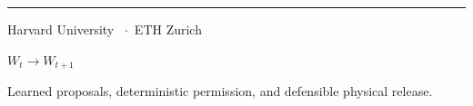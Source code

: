 {\begin{titlepage}
%
  \restoregeometry
\end{titlepage}%

\begin{titlepage}\thispagestyle{empty}%
  \raggedright
  \vspace*{0.9in}
  {\textcolor{harvardcrimson}{\rule{2.8in}{1.6pt}}\par}
  \vspace{0.35in}
  {\sffamily\bfseries\fontsize{28}{32}\selectfont\color{structural}\@title\par}
  \vspace{0.12in}
  {\sffamily\bfseries\fontsize{13}{17}\selectfont\color{consequence}\@subtitle\par}
  \vspace{0.8in}
  {\sffamily\large\bfseries\color{structural}\@author\par}
  \vspace{0.06in}
  {\sffamily\normalsize\color{softink}Harvard University \ $\cdot$\  ETH Zurich\par}
  \vspace{0.25in}
  {\sffamily\small\color{softink}\@date\par}
  \vfill
  {\sffamily\bfseries\color{consequence}$W_t \longrightarrow W_{t+1}$\par}
  \vspace{0.15in}
  {\sffamily\footnotesize\color{paleink}%
   Learned proposals, deterministic permission, and defensible physical release.\par}
  \vspace{0.4in}
\end{titlepage}%

}
\makeatother
